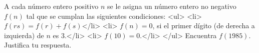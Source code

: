 A cada número entero positivo $n$ se le asigna un número entero no negativo $f(n)$ tal que se cumplan las siguientes condiciones:
<ul>
<li> $f(rs) = f(r)+f(s)$</li>
<li> $f(n) = 0$, si el primer dígito (de derecha a izquierda) de $n$ es 3.</li>
<li> $f(10) = 0$.</li>
</ul>
Encuentra $f(1985)$. Justifica tu respuesta.

